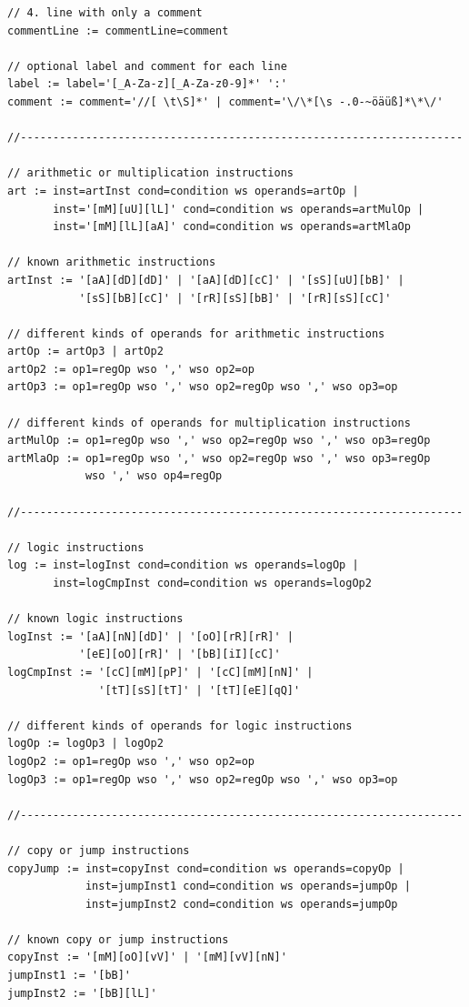 \documentclass[a4paper, 11pt, onecolumn]{article}
\begin{document}
\begin{lstlisting}[basicstyle=\ttfamily\footnotesize, caption={[Vollständige Grammatik]}]
// 4. line with only a comment
commentLine := commentLine=comment

// optional label and comment for each line
label := label='[_A-Za-z][_A-Za-z0-9]*' ':'
comment := comment='//[ \t\S]*' | comment='\/\*[\s -.0-~öäüß]*\*\/'

//--------------------------------------------------------------------

// arithmetic or multiplication instructions
art := inst=artInst cond=condition ws operands=artOp |
       inst='[mM][uU][lL]' cond=condition ws operands=artMulOp |
       inst='[mM][lL][aA]' cond=condition ws operands=artMlaOp

// known arithmetic instructions
artInst := '[aA][dD][dD]' | '[aA][dD][cC]' | '[sS][uU][bB]' |
           '[sS][bB][cC]' | '[rR][sS][bB]' | '[rR][sS][cC]'

// different kinds of operands for arithmetic instructions
artOp := artOp3 | artOp2
artOp2 := op1=regOp wso ',' wso op2=op
artOp3 := op1=regOp wso ',' wso op2=regOp wso ',' wso op3=op

// different kinds of operands for multiplication instructions
artMulOp := op1=regOp wso ',' wso op2=regOp wso ',' wso op3=regOp
artMlaOp := op1=regOp wso ',' wso op2=regOp wso ',' wso op3=regOp
            wso ',' wso op4=regOp

//--------------------------------------------------------------------

// logic instructions
log := inst=logInst cond=condition ws operands=logOp |
       inst=logCmpInst cond=condition ws operands=logOp2

// known logic instructions
logInst := '[aA][nN][dD]' | '[oO][rR][rR]' |
           '[eE][oO][rR]' | '[bB][iI][cC]'
logCmpInst := '[cC][mM][pP]' | '[cC][mM][nN]' |
              '[tT][sS][tT]' | '[tT][eE][qQ]'

// different kinds of operands for logic instructions
logOp := logOp3 | logOp2
logOp2 := op1=regOp wso ',' wso op2=op
logOp3 := op1=regOp wso ',' wso op2=regOp wso ',' wso op3=op

//--------------------------------------------------------------------

// copy or jump instructions
copyJump := inst=copyInst cond=condition ws operands=copyOp |
            inst=jumpInst1 cond=condition ws operands=jumpOp |
            inst=jumpInst2 cond=condition ws operands=jumpOp

// known copy or jump instructions
copyInst := '[mM][oO][vV]' | '[mM][vV][nN]'
jumpInst1 := '[bB]'
jumpInst2 := '[bB][lL]'


\end{lstlisting}
\end{document}
